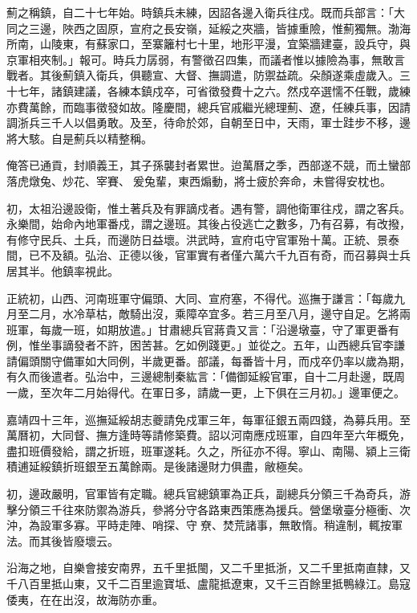薊之稱鎮，自二十七年始。時鎮兵未練，因詔各邊入衛兵往戍。既而兵部言：「大同之三邊，陜西之固原，宣府之長安嶺，延綏之夾牆，皆據重險，惟薊獨無。渤海所南，山陵東，有蘇家口，至寨籬村七十里，地形平漫，宜築牆建臺，設兵守，與京軍相夾制。」報可。時兵力孱弱，有警徵召四集，而議者惟以據險為事，無敢言戰者。其後薊鎮入衛兵，俱聽宣、大督、撫調遣，防禦益疏。朵顏遂乘虛歲入。三十七年，諸鎮建議，各練本鎮戍卒，可省徵發費十之六。然戍卒選懦不任戰，歲練亦費萬餘，而臨事徵發如故。隆慶間，總兵官戚繼光總理薊、遼，任練兵事，因請調浙兵三千人以倡勇敢。及至，待命於郊，自朝至日中，天雨，軍士跬步不移，邊將大駭。自是薊兵以精整稱。

俺答已通貢，封順義王，其子孫襲封者累世。迨萬曆之季，西部遂不競，而土蠻部落虎燉兔、炒花、宰賽、爰兔輩，東西煽動，將士疲於奔命，未嘗得安枕也。

初，太祖沿邊設衛，惟土著兵及有罪謫戍者。遇有警，調他衛軍往戍，謂之客兵。永樂間，始命內地軍番戍，謂之邊班。其後占役逃亡之數多，乃有召募，有改撥，有修守民兵、土兵，而邊防日益壞。洪武時，宣府屯守官軍殆十萬。正統、景泰間，已不及額。弘治、正德以後，官軍實有者僅六萬六千九百有奇，而召募與士兵居其半。他鎮率視此。

正統初，山西、河南班軍守偏頭、大同、宣府塞，不得代。巡撫于謙言：「每歲九月至二月，水冷草枯，敵騎出沒，乘障卒宜多。若三月至八月，邊守自足。乞將兩班軍，每歲一班，如期放遣。」甘肅總兵官蔣貴又言：「沿邊墩臺，守了軍更番有例，惟坐事謫發者不許，困苦甚。乞如例踐更。」並從之。五年，山西總兵官李謙請偏頭關守備軍如大同例，半歲更番。部議，每番皆十月，而戍卒仍率以歲為期，有久而後遣者。弘治中，三邊總制秦紘言：「備御延綏官軍，自十二月赴邊，既周一歲，至次年二月始得代。在軍日多，請歲一更，上下俱在三月初。」邊軍便之。

嘉靖四十三年，巡撫延綏胡志夔請免戍軍三年，每軍征銀五兩四錢，為募兵用。至萬曆初，大同督、撫方逢時等請修築費。詔以河南應戍班軍，自四年至六年概免，盡扣班價發給，謂之折班，班軍遂耗。久之，所征亦不得。寧山、南陽、潁上三衛積逋延綏鎮折班銀至五萬餘兩。是後諸邊財力俱盡，敝極矣。

初，邊政嚴明，官軍皆有定職。總兵官總鎮軍為正兵，副總兵分領三千為奇兵，游擊分領三千往來防禦為游兵，參將分守各路東西策應為援兵。營堡墩臺分極衝、次沖，為設軍多寡。平時走陣、哨探、守尞、焚荒諸事，無敢惰。稍違制，輒按軍法。而其後皆廢壞云。

沿海之地，自樂會接安南界，五千里抵閩，又二千里抵浙，又二千里抵南直隸，又千八百里抵山東，又千二百里逾寶坻、盧龍抵遼東，又千三百餘里抵鴨綠江。島寇倭夷，在在出沒，故海防亦重。

